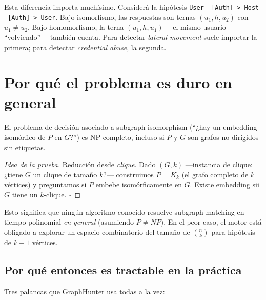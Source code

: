 \begin{advertencia}
Esta diferencia importa muchísimo. Considerá la hipótesis
\texttt{User -[Auth]-> Host -[Auth]-> User}. Bajo isomorfismo, las
respuestas son ternas \((u_1, h, u_2)\) con \(u_1 \neq u_2\). Bajo
homomorfismo, la terna \((u_1, h, u_1)\) ---el mismo usuario
``volviendo''--- también cuenta. Para detectar \emph{lateral
movement} suele importar la primera; para detectar \emph{credential
abuse}, la segunda.
\end{advertencia}

\section{Por qué el problema es duro en general}

\begin{theorem}
El problema de decisión asociado a subgraph isomorphism (``¿hay un
embedding isomórfico de \(P\) en \(G\)?'') es NP-completo, incluso
si \(P\) y \(G\) son grafos no dirigidos sin etiquetas.
\end{theorem}

\begin{proof}[Idea de la prueba]
Reducción desde \emph{clique}. Dado \((G, k)\) ---instancia de
clique: ¿tiene \(G\) un clique de tamaño \(k\)?--- construimos
\(P = K_k\) (el grafo completo de \(k\) vértices) y preguntamos si
\(P\) embebe isomórficamente en \(G\). Existe embedding sii \(G\)
tiene un \(k\)-clique. \(\square\)
\end{proof}

Esto significa que ningún algoritmo conocido resuelve subgraph
matching en tiempo polinomial \emph{en general} (asumiendo \(P \neq
NP\)). En el peor caso, el motor está obligado a explorar un espacio
combinatorio del tamaño de \(\binom{n}{k}\) para hipótesis de
\(k+1\) vértices.

\subsection{Por qué entonces es tractable en la práctica}

Tres palancas que GraphHunter usa todas a la vez:


